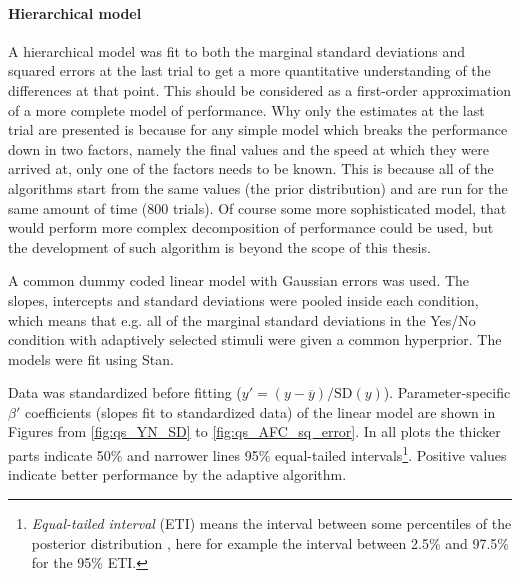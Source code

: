\documentclass{article}\usepackage{knitr}
\begin{document}
\paragraph{Hierarchical model}

A hierarchical model was fit to both the marginal standard deviations and squared errors at the last trial to get a more quantitative understanding of the differences at that point. This should be considered as a first-order approximation of a more complete model of performance. Why only the estimates at the last trial are presented is because for any simple model which breaks the performance down in two factors, namely the final values and the speed at which they were arrived at, only one of the factors needs to be known. This is because all of the algorithms start from the same values (the prior distribution) and are run for the same amount of time (800 trials). Of course some more sophisticated model, that would perform more complex decomposition of performance could be used, but the development of such algorithm is beyond the scope of this thesis. 

A common dummy coded linear model with Gaussian errors was used. The slopes, intercepts and standard deviations were pooled inside each condition, which means that e.g. all of the marginal standard deviations in the Yes/No condition with adaptively selected stimuli were given a common hyperprior. The models were fit using Stan.

Data was standardized before fitting ($y' = (y - \overline{y}) / \text{SD}(y) $). Parameter-specific $\beta'$ coefficients (slopes fit to standardized data) of the linear model are shown in Figures from \ref{fig:qs_YN_SD} to \ref{fig:qs_AFC_sq_error}. In all plots the thicker parts indicate 50\% and narrower lines 95\% equal-tailed intervals\footnote{\textit{Equal-tailed interval} (ETI) means the interval between some percentiles of the posterior distribution \citep[p. 342]{kruschke2015}, here for example the interval between 2.5\% and 97.5\% for the 95\% ETI.}. Positive values indicate better performance by the adaptive algorithm.
\end{document}
